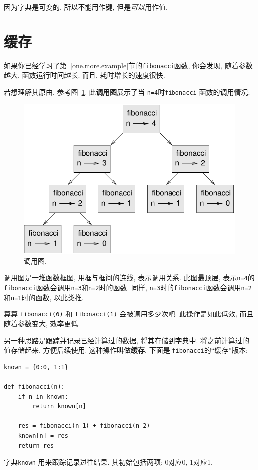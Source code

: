 \documentclass[10pt]{book}
\begin{document}
因为字典是可变的, 所以不能用作键, 
但是{\em 可以}用作值. 

\section{缓存}
\label{memoize}

如果你已经学习了第~\ref{one.more.example}节的{\tt fibonacci}函数, 
你会发现, 随着参数越大, 函数运行时间越长. 而且, 耗时增长的速度很快. 

若想理解其原由, 参考图~\ref{fig.fibonacci}, 此{\bf 调用图}展示了当
{\tt n=4}时{\tt fibonacci} 函数的调用情况:
\begin{figure}
\centerline
{\includegraphics[scale=0.7]{figs/fibonacci.pdf}}
\caption{调用图.}
\label{fig.fibonacci}
\end{figure}
调用图是一堆函数框图, 用框与框间的连线, 表示调用关系. 
此图最顶层, 表示{\tt n=4}的{\tt fibonacci}函数会调用{\tt n=3}和{\tt n=2}时的函数. 
同样, {\tt n=3}时的{\tt fibonacci}函数会调用{\tt n=2}和{\tt n=1}时的函数, 
以此类推. 

算算 {\tt fibonacci(0)} 和 {\tt fibonacci(1)} 会被调用多少次吧. 
此操作是如此低效, 而且随着参数变大, 效率更低. 

另一种思路是跟踪并记录已经计算过的数据, 将其存储到字典中. 
将之前计算过的值存储起来, 方便后续使用, 这种操作叫做{\bf 缓存}.
下面是 {\tt fibonacci}的``缓存''版本:

\begin{verbatim}
known = {0:0, 1:1}

def fibonacci(n):
    if n in known:
        return known[n]

    res = fibonacci(n-1) + fibonacci(n-2)
    known[n] = res
    return res
\end{verbatim}
%
字典{\tt known} 用来跟踪记录过往结果. 
其初始包括两项: 0对应0, 1对应1.
\end{document}
